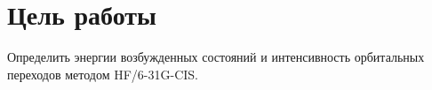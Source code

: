 \section{Цель работы}
Определить энергии возбужденных состояний и интенсивность орбитальных переходов методом HF/6-31G-CIS.
